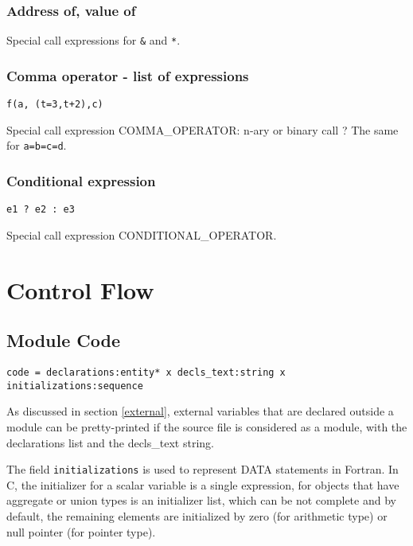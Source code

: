 \documentclass[a4paper]{report}
\begin{document}
\subsection{Address of, value of}

Special call expressions for \verb/&/ and \texttt{*}.

\subsection{Comma operator - list of expressions}

\lstinline|f(a, (t=3,t+2),c)|

Special call expression COMMA\_OPERATOR: n-ary or binary call ?
The same for \lstinline/a=b=c=d/. 

\subsection{Conditional expression}

\lstinline|e1 ? e2 : e3 |

Special call expression CONDITIONAL\_OPERATOR.


\chapter{Control Flow}

\section{Module Code}

\verb/code = declarations:entity* x decls_text:string x initializations:sequence/

As discussed in section \ref{external}, external variables that are
declared outside a module can be pretty-printed if the source file is
considered as a module, with the declarations list and the decls\_text string. 

The field \verb/initializations/ is used to represent DATA statements in
Fortran. 
In C, the initializer for a scalar variable is a single expression, for
objects that have aggregate or union types is an initializer list, which
can be not complete and by default, the remaining elements are initialized by zero (for
arithmetic type) or null pointer (for pointer type).
\end{document}
